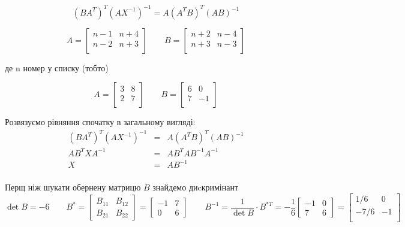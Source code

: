 {}

$$
  (BA^T)^T(AX^{-1})^{-1} = A(A^TB)^T(AB)^{-1}
$$


$$
A = \begin{bmatrix}
  n-1 & n+4 \\
  n-2 & n+3  \\
  \end{bmatrix} \qquad
B = \begin{bmatrix}
  n+2 & n-4 \\
  n+3 & n-3  \\
\end{bmatrix}
$$

\begin{center}де n номер у списку (тобто)\end{center}

$$
A = \begin{bmatrix}
  3 & 8 \\
  2 & 7  \\
  \end{bmatrix}
\qquad
B = \begin{bmatrix}
  6 & 0 \\
  7 & -1  \\
\end{bmatrix}
$$


Розвязуємо рівняння спочатку в загальному вигляді:
$$
\begin{array}{rcl}
    (BA^T)^T(AX^{-1})^{-1} &=& A(A^TB)^T(AB)^{-1} \\
    AB^TXA^{-1} &=& AB^TAB^{-1}A^{-1} \\
    X  &=& AB^{-1}  \\
\end{array}
$$

Перщ ніж шукати обернену матрицю $B$ знайдемо диcкримінант
$$
\det{B} = -6 \qquad B^* = \begin{bmatrix}
  B_{11} & B_{12} \\
  B_{21} & B_{22}
\end{bmatrix} = \begin{bmatrix}
  -1 & 7 \\
  0 & 6
\end{bmatrix} \qquad
B^{-1} = \dfrac{1}{\det{B}} \cdot B^{*T} = -\dfrac{1}{6} \begin{bmatrix}
  -1 & 0 \\
  7 & 6
\end{bmatrix} = \begin{bmatrix}
   1/6 &  0 \\
  -7/6 & -1 \\
\end{bmatrix}
$$

